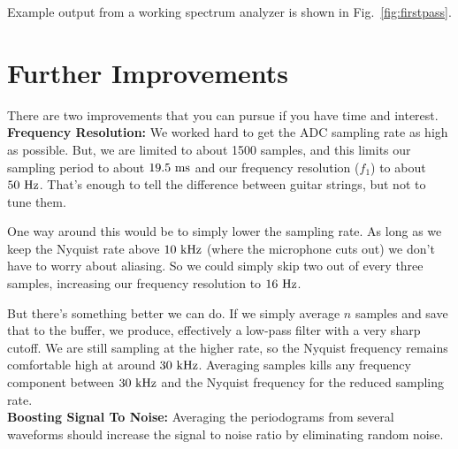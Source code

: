 \documentclass[12pt]{article}
\begin{document}
Example output from a working spectrum analyzer is shown in Fig.~\ref{fig:firstpass}.


\section{Further Improvements}

There are two improvements that you can pursue if you have time and interest.\\

\noindent
{\bf Frequency Resolution:}  We worked hard to get the ADC sampling rate as high as possible.  But, we are limited to about 1500 samples, and this limits our sampling period to about $19.5~\rm ms$ and our frequency resolution ($f_1$) to about $50~\rm Hz$.  That's enough to tell the difference between guitar strings, but not to tune them.

One way around this would be to simply lower the sampling rate.  As long as we keep the Nyquist rate above $10~\rm kHz$ (where the microphone cuts out) we don't have to worry about aliasing.  So we could simply skip two out of every three samples, increasing our frequency resolution to $16~\rm Hz$.

But there's something better we can do.  If we simply average $n$ samples and save that to the buffer, we produce, effectively a low-pass filter with a very sharp cutoff.  We are still sampling at the higher rate, so the Nyquist frequency remains comfortable high at around $30~\rm kHz$.  Averaging samples kills any frequency component between $30~\rm kHz$ and the Nyquist frequency for the reduced sampling rate.\\

\noindent
{\bf Boosting Signal To Noise:}  Averaging the periodograms from several waveforms should increase the signal to noise ratio by eliminating random noise.  
\end{document}

